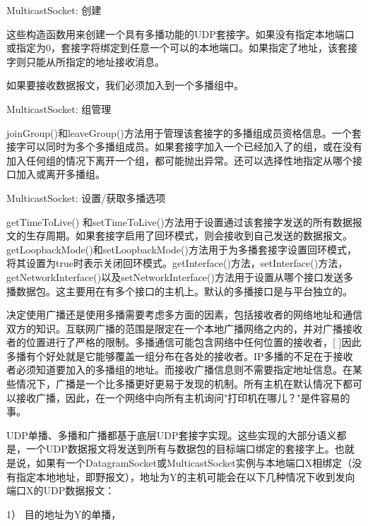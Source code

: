 		MulticastSocket: 创建 

		

		这些构造函数用来创建一个具有多播功能的UDP套接字。如果没有指定本地端口或指定为0，套接字将绑定到任意一个可以的本地端口。如果指定了地址，该套接字则只能从所指定的地址接收消息。 

		如果要接收数据报文，我们必须加入到一个多播组中。 

		MulticastSocket: 组管理 

		

		joinGroup()和leaveGroup()方法用于管理该套接字的多播组成员资格信息。一个套接字可以同时为多个多播组成员。如果套接字加入一个已经加入了的组，或在没有加入任何组的情况下离开一个组，都可能抛出异常。还可以选择性地指定从哪个接口加入或离开多播组。 

		MulticastSocket: 设置/获取多播选项 

		

		getTimeToLive() 和setTimeToLive()方法用于设置通过该套接字发送的所有数据报文的生存周期。如果套接字启用了回环模式，则会接收到自己发送的数据报文。getLoopbackMode()和setLoopbackMode()方法用于为多播套接字设置回环模式，将其设置为true时表示关闭回环模式。getInterface()方法，setInterface()方法，getNetworkInterface()以及setNetworkInterface()方法用于设置从哪个接口发送多播数据包。这主要用在有多个接口的主机上。默认的多播接口是与平台独立的。 

		决定使用广播还是使用多播需要考虑多方面的因素，包括接收者的网络地址和通信双方的知识。互联网广播的范围是限定在一个本地广播网络之内的，并对广播接收者的位置进行了严格的限制。多播通信可能包含网络中任何位置的接收者，[ ]因此多播有个好处就是它能够覆盖一组分布在各处的接收者。IP多播的不足在于接收者必须知道要加入的多播组的地址。而接收广播信息则不需要指定地址信息。在某些情况下，广播是一个比多播更好更易于发现的机制。所有主机在默认情况下都可以接收广播，因此，在一个网络中向所有主机询问"打印机在哪儿？"是件容易的事。 

		UDP单播、多播和广播都基于底层UDP套接字实现。这些实现的大部分语义都是，一个UDP数据报文将发送到所有与数据包的目标端口绑定的套接字上。也就是说，如果有一个DatagramSocket或MulticastSocket实例与本地端口X相绑定（没有指定本地地址，即野报文），地址为Y的主机可能会在以下几种情况下收到发向端口X的UDP数据报文：

		1） 目的地址为Y的单播，


